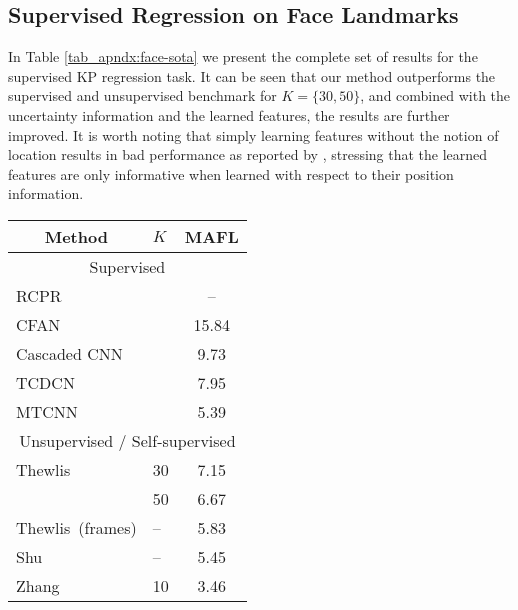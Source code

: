 \documentclass[nohyperref]{article}
\theoremstyle{plain}
\theoremstyle{definition}
\theoremstyle{remark}
\begin{document}
\subsection{Supervised Regression on Face Landmarks}
\label{apndx:supervised_kp}
In Table \ref{tab_apndx:face-sota} we present the complete set of results for the supervised KP regression task. It can be seen that our method outperforms the supervised and unsupervised benchmark for $K=\{30, 50\}$, and combined with the uncertainty information and the learned features, the results are further improved. It is worth noting that simply learning features without the notion of location results in bad performance as reported by \citet{jakab2018unsupervised}, stressing that the learned features are only informative when learned with respect to their position information.
\begin{table}
\setlength{\tabcolsep}{4pt}
    \centering
    \begin{tabular}{@{}llc@{}}
    \toprule
    \multicolumn{1}{c}{Method}                    & $K$  & MAFL        \\ \midrule
    \multicolumn{3}{c}{Supervised}                                           \\
    RCPR~\citep{burgos2013robust}                 &      & {--}                         \\
    CFAN~\citep{zhang2014coarse}                  &      & 15.84                         \\
    Cascaded CNN~\citep{sun2013deep}              &      & 9.73                          \\
    TCDCN~\citep{zhang2015learning}                       &      & 7.95                           \\
    MTCNN~\citep{zhang2014facial}                 &      & 5.39                         \\ \midrule
    \multicolumn{3}{c}{Unsupervised / Self-supervised}                                           \\
    Thewlis~\citep{thewlis2017unsupervised1}          & 30   & 7.15                         \\
                                                  & 50   & 6.67                         \\
    Thewlis~\citep{thewlis2017unsupervised2}(frames) & {--} & 5.83                          \\
    Shu~\citep{shu2018deforming}         & {--} & 5.45                            \\
    Zhang~\citep{zhang2018kp}            & 10   & 3.46                           \\

\end{tabular}
\end{table}
\end{document}
